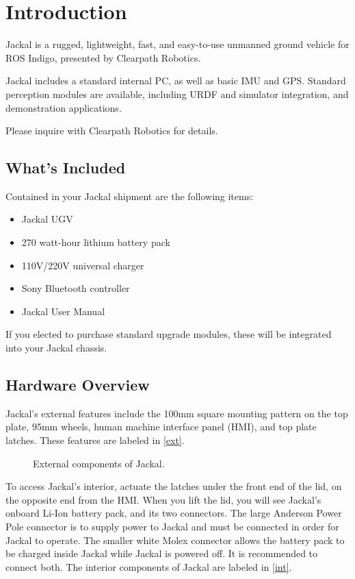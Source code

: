 \documentclass[]{clearpath-manual}
\begin{document}
\tableofcontents

\section{Introduction}

Jackal is a rugged, lightweight, fast, and easy-to-use unmanned ground vehicle for ROS
Indigo, presented by Clearpath Robotics.

Jackal includes a standard internal PC, as well as basic IMU and GPS. Standard
perception modules are available, including URDF and simulator integration, and
demonstration applications.

Please inquire with Clearpath Robotics for details.

\subsection{What's Included}

Contained in your Jackal shipment are the following items:

\begin{itemize}
  \item Jackal UGV
  \item 270 watt-hour lithium battery pack
  \item 110V/220V universal charger
  \item Sony Bluetooth controller
  \item Jackal User Manual
\end{itemize}

If you elected to purchase standard upgrade modules, these will be integrated into your Jackal chassis.

\subsection{Hardware Overview}

Jackal's external features include the 100mm square mounting pattern on the top plate, 95mm wheels, human
machine interface panel (HMI), and top plate latches. These features are labeled in \autoref{ext}.

\begin{figure}[ht]
  \centering
  \placeholder{9cm}{5cm}
  \caption{External components of Jackal.}
  \label{ext}
\end{figure}

To access Jackal's interior, actuate the latches under the front end of the lid, on the opposite end from
the HMI. When you lift the lid, you will see Jackal's onboard Li-Ion battery pack, and its two connectors.
The large Anderson Power Pole connector is to supply power to Jackal and must be connected in order for
Jackal to operate. The smaller white Molex connector allows the battery pack to be charged inside Jackal 
while Jackal is powered off. It is recommended to connect both. The interior components of Jackal are
labeled in \autoref{int}.
\end{document}
